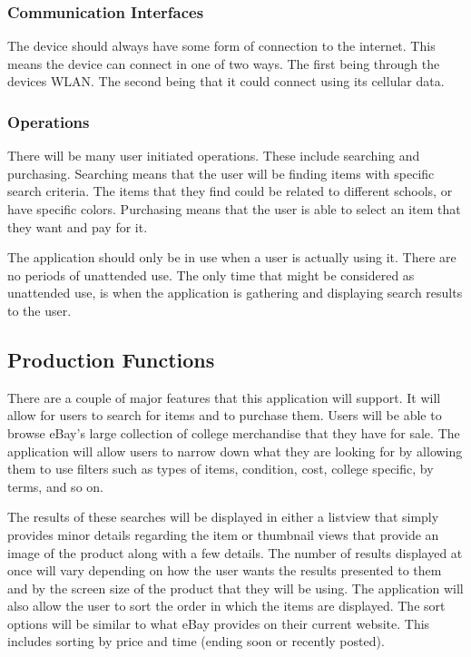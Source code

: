 \documentclass[journal,compsoc, 10pt, draftclsnofoot, onecolumn]{IEEEtran}
\begin{document}
\subsubsection{Communication Interfaces}

The device should always have some form of connection to the internet. This 
means the device can connect in one of two ways. The first being through the 
devices WLAN. The second being that it could connect using its cellular data.

\subsubsection{Operations}

There will be many user initiated operations. These include searching and 
purchasing. Searching means that the user will be finding items with specific 
search criteria. The items that they find could be related to different schools,
 or have specific colors. Purchasing means that the user is able to select an 
item that they want and pay for it.\newline

The application should only be in use when a user is actually using it. There 
are no periods of unattended use. The only time that might be considered as 
unattended use, is when the application is gathering and displaying search 
results to the user. 

\subsection{Production Functions}

There are a couple of major features that this application will support. It will
 allow for users to search for items and to purchase them. Users will be able 
to browse eBay's large collection of college merchandise that they have for 
sale. The application will allow users to narrow down what they are looking for 
by allowing them to use filters such as types of items, condition, cost, college
 specific, by terms, and so on. \newline

The results of these searches will be displayed in either a listview that simply
 provides minor details regarding the item or thumbnail views that provide an 
image of the product along with a few details. The number of results displayed 
at once will vary depending on how the user wants the results presented to them 
and by the screen size of the product that they will be using. The application 
will also allow the user to sort the order in which the items are displayed. The
 sort options will be similar to what eBay provides on their current website. 
This includes sorting by price and time (ending soon or recently posted).
\end{document}

